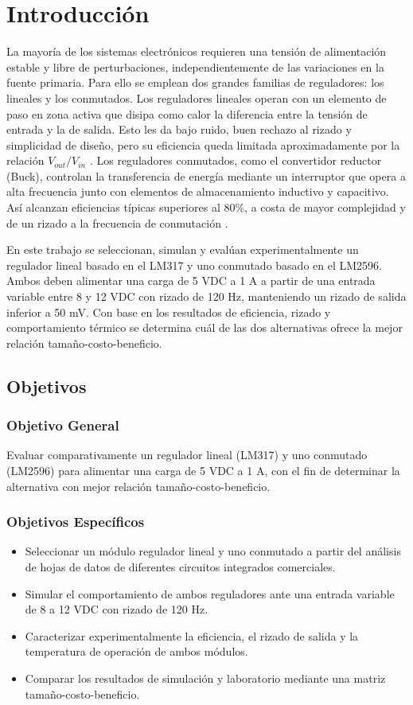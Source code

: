 \documentclass[conference]{IEEEtran}
\begin{document}
\section{\textbf{Introducción}}
La mayoría de los sistemas electrónicos requieren una tensión de alimentación estable y libre de perturbaciones, independientemente de las variaciones en la fuente primaria. Para ello se emplean dos grandes familias de reguladores: los lineales y los conmutados. Los reguladores lineales operan con un elemento de paso en zona activa que disipa como calor la diferencia entre la tensión de entrada y la de salida. Esto les da bajo ruido, buen rechazo al rizado y simplicidad de diseño, pero su eficiencia queda limitada aproximadamente por la relación $V_{out}/V_{in}$ \cite{hart}. Los reguladores conmutados, como el convertidor reductor (Buck), controlan la transferencia de energía mediante un interruptor que opera a alta frecuencia junto con elementos de almacenamiento inductivo y capacitivo. Así alcanzan eficiencias típicas superiores al 80\%, a costa de mayor complejidad y de un rizado a la frecuencia de conmutación \cite{rashid}.

En este trabajo se seleccionan, simulan y evalúan experimentalmente un regulador lineal basado en el LM317 y uno conmutado basado en el LM2596. Ambos deben alimentar una carga de 5 VDC a 1 A a partir de una entrada variable entre 8 y 12 VDC con rizado de 120 Hz, manteniendo un rizado de salida inferior a 50 mV. Con base en los resultados de eficiencia, rizado y comportamiento térmico se determina cuál de las dos alternativas ofrece la mejor relación tamaño-costo-beneficio.

\FloatBarrier
\subsection{\textbf{Objetivos}}
\subsubsection{\textbf{Objetivo General}}
Evaluar comparativamente un regulador lineal (LM317) y uno conmutado (LM2596) para alimentar una carga de 5 VDC a 1 A, con el fin de determinar la alternativa con mejor relación tamaño-costo-beneficio.

\medskip
\subsubsection{\textbf{Objetivos Específicos}}
\begin{itemize}
    \item Seleccionar un módulo regulador lineal y uno conmutado a partir del análisis de hojas de datos de diferentes circuitos integrados comerciales.
    \item Simular el comportamiento de ambos reguladores ante una entrada variable de 8 a 12 VDC con rizado de 120 Hz.
    \item Caracterizar experimentalmente la eficiencia, el rizado de salida y la temperatura de operación de ambos módulos.
    \item Comparar los resultados de simulación y laboratorio mediante una matriz tamaño-costo-beneficio.
\end{itemize}
\end{document}
